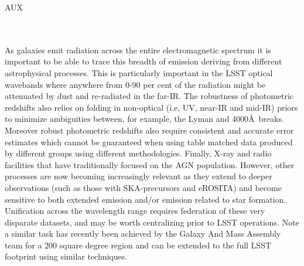 {\begin{tasklist}{AUX}
\begin{task}
{\begin{enumerate}
\end{enumerate}
~\\~\\
As galaxies emit radiation across the entire electromagnetic spectrum it is important to be able to trace this breadth of emission deriving from different astrophysical processes. This is particularly important in the LSST optical wavebands where anywhere from 0-90 per cent of the radiation might be attenuated by dust and re-radiated in the far-IR. 
The robustness of photometric redshifts also relies on folding in non-optical (i.e, UV, near-IR and mid-IR) priors to minimize ambiguities between, for example, the Lyman and 4000\AA~breaks. Moreover robust photometric redshifts also require consistent and accurate error estimates which cannot be guaranteed when using table matched data produced by different groups using different methodologies.
Finally, X-ray and radio facilities that have traditionally focused on the AGN population. However, other processes are now becoming increasingly relevant as they extend to deeper observations (such as those with SKA-precursors and eROSITA) and become sensitive to both extended emission and/or emission related to star formation. Unification across the wavelength range requires federation of these very disparate datasets, and may be worth centralizing prior to LSST operations.
Note a similar task has recently been achieved by the Galaxy And Mass Assembly team for a 200 square degree region \citep[see][and http://www/gama-survey.org/]{driver2016a} and can be extended to the full LSST footprint using similar techniques.
}
~\\
\end{task}


\end{tasklist}}

